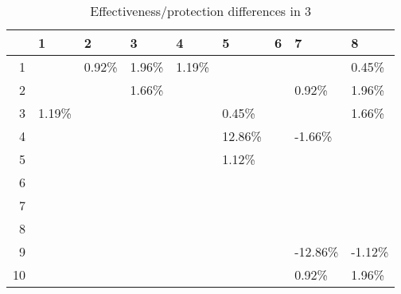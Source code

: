 \begin{table}[ht]
\centering
\begin{tabular}{rllllllll}
  \hline
 & 1 & 2 & 3 & 4 & 5 & 6 & 7 & 8 \\ 
  \hline
1 &  & 0.92\% & 1.96\% & 1.19\% &  &  &  & 0.45\% \\ 
  2 &  &  & 1.66\% &  &  &  & 0.92\% & 1.96\% \\ 
  3 & 1.19\% &  &  &  & 0.45\% &  &  & 1.66\% \\ 
  4 &  &  &  &  & 12.86\% &  & -1.66\% &  \\ 
  5 &  &  &  &  & 1.12\% &  &  &  \\ 
  6 &  &  &  &  &  &  &  &  \\ 
  7 &  &  &  &  &  &  &  &  \\ 
  8 &  &  &  &  &  &  &  &  \\ 
  9 &  &  &  &  &  &  & -12.86\% & -1.12\% \\ 
  10 &  &  &  &  &  &  & 0.92\% & 1.96\% \\ 
   \hline
\end{tabular}
\caption{Effectiveness/protection differences in  3} 
\end{table}
